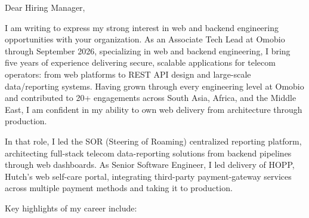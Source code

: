 \documentclass[11pt]{article}
\begin{document}

Dear Hiring Manager,

I am writing to express my strong interest in web and backend engineering opportunities with your organization. As an Associate Tech Lead at Omobio through September 2026, specializing in web and backend engineering, I bring five years of experience delivering secure, scalable applications for telecom operators: from web platforms to REST API design and large-scale data/reporting systems. Having grown through every engineering level at Omobio and contributed to 20+ engagements across South Asia, Africa, and the Middle East, I am confident in my ability to own web delivery from architecture through production.

In that role, I led the SOR (Steering of Roaming) centralized reporting platform, architecting full-stack telecom data-reporting solutions from backend pipelines through web dashboards. As Senior Software Engineer, I led delivery of HOPP, Hutch's web self-care portal, integrating third-party payment-gateway services across multiple payment methods and taking it to production.

Key highlights of my career include:

\begin{clitems}
  \item {}
  \item {}
  \item {}
  \item {}
\end{clitems}
\end{document}
